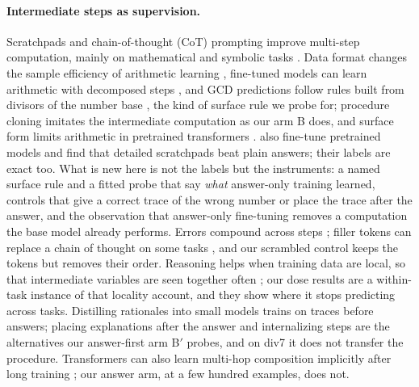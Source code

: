 \documentclass{article}
\theoremstyle{definition}
\begin{document}
\paragraph{Intermediate steps as supervision.} Scratchpads \citep{nye2021show} and chain-of-thought (CoT) prompting \citep{wei2022chain} improve multi-step computation, mainly on mathematical and symbolic tasks \citep{sprague2025cot}. Data format changes the sample efficiency of arithmetic learning \citep{lee2024teaching}, fine-tuned models can learn arithmetic with decomposed steps \citep{liu2023goat}, and GCD predictions follow rules built from divisors of the number base \citep{charton2024gcd}, the kind of surface rule we probe for; procedure cloning \citep{yang2022procedure} imitates the intermediate computation as our arm B does, and surface form limits arithmetic in pretrained transformers \citep{nogueira2021investigating}. \citet{lee2024teaching} also fine-tune pretrained models and find that detailed scratchpads beat plain answers; their labels are exact too. What is new here is not the labels but the instruments: a named surface rule and a fitted probe that say \emph{what} answer-only training learned, controls that give a correct trace of the wrong number or place the trace after the answer, and the observation that answer-only fine-tuning removes a computation the base model already performs. Errors compound across steps \citep{dziri2023faith}; filler tokens can replace a chain of thought on some tasks \citep{pfau2024dot}, and our scrambled control keeps the tokens but removes their order. Reasoning helps when training data are local, so that intermediate variables are seen together often \citep{prystawski2023why}; our dose results are a within-task instance of that locality account, and they show where it stops predicting across tasks. Distilling rationales into small models \citep{hsieh2023distilling,ho2023teachers,magister2023teaching} trains on traces before answers; placing explanations after the answer \citep{lampinen2022explanations} and internalizing steps \citep{deng2023implicit,deng2024explicit} are the alternatives our answer-first arm B$'$ probes, and on div7 it does not transfer the procedure. Transformers can also learn multi-hop composition implicitly after long training \citep{wang2024grokked}; our answer arm, at a few hundred examples, does not.
\end{document}
